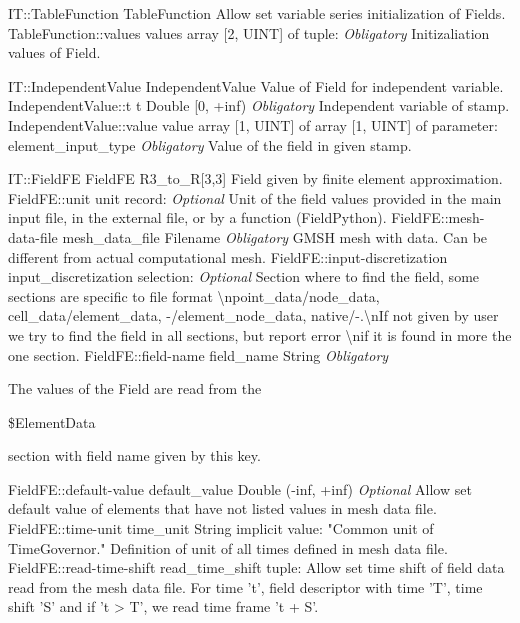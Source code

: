 \begin{RecordType}
	{IT::TableFunction}
	{TableFunction}
	{}%
	{}%
	{{{Allow set variable series initialization of Fields.}%
}}
		\RecKey
			{TableFunction::values}
			{values}
			{{array [2, UINT] of }{tuple: }}{}
			{ \it{Obligatory}}
			{{{Initizaliation values of Field.}%
}}
\end{RecordType}
\begin{TupleType}
	{IT::IndependentValue}
	{IndependentValue}
	{}%
	{}%
	{{{Value of Field for independent variable.}%
}}
		\RecKey
			{IndependentValue::t}
			{t}
			{{Double [0, +inf)}}{}
			{ \it{Obligatory}}
			{{{Independent variable of stamp.}%
}}
		\RecKey
			{IndependentValue::value}
			{value}
			{{array [1, UINT] of }{array [1, UINT] of }{parameter: element{\_}input{\_}type}}{}
			{ \it{Obligatory}}
			{{{Value of the field in given stamp.}%
}}
\end{TupleType}
\begin{RecordType}
	{IT::FieldFE}
	{FieldFE}
	{}%
	{}%
	{{{R3{\_}to{\_}R[3,3] Field given by finite element approximation.}%
}}
		\RecKey
			{FieldFE::unit}
			{unit}
			{{record: }}{}
			{ \it{Optional}}
			{{{Unit of the field values provided in the main input file, in the external file, or by a function (FieldPython).}%
}}
		\RecKey
			{FieldFE::mesh-data-file}
			{mesh{\_}data{\_}file}
			{{Filename}}{}
			{ \it{Obligatory}}
			{{{GMSH mesh with data.
Can be different from actual computational mesh.}%
}}
		\RecKey
			{FieldFE::input-discretization}
			{input{\_}discretization}
			{{selection: }}{}
			{ \it{Optional}}
			{{{Section where to find the field, some sections are specific to file format {\textbackslash}npoint{\_}data/node{\_}data, cell{\_}data/element{\_}data, -/element{\_}node{\_}data, native/-.{\textbackslash}nIf not given by user we try to find the field in all sections, but report error {\textbackslash}nif it is found in more the one section.}%
}}
		\RecKey
			{FieldFE::field-name}
			{field{\_}name}
			{{String}}{}
			{ \it{Obligatory}}
			{{{The values of the Field are read from the }\begin{ttfamily}{\$}ElementData\end{ttfamily}{ section with field name given by this key.}%
}}
		\RecKey
			{FieldFE::default-value}
			{default{\_}value}
			{{Double (-inf, +inf)}}{}
			{ \it{Optional}}
			{{{Allow set default value of elements that have not listed values in mesh data file.}%
}}
		\RecKey
			{FieldFE::time-unit}
			{time{\_}unit}
			{{String}}{}
			{implicit value: "{Common unit of TimeGovernor.}"}
			{{{Definition of unit of all times defined in mesh data file.}%
}}
		\RecKey
			{FieldFE::read-time-shift}
			{read{\_}time{\_}shift}
			{{tuple: }}{}
			{ }
			{{{Allow set time shift of field data read from the mesh data file.
For time 't', field descriptor with time 'T', time shift 'S' and if 't {\textgreater} T', we read time frame 't + S'.}%
}}
\end{RecordType}

